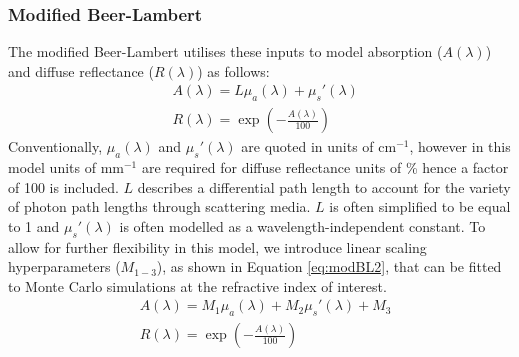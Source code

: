\subsubsection{Modified Beer-Lambert}
The modified Beer-Lambert utilises these inputs to model absorption ($A(\lambda)$) and diffuse reflectance ($R(\lambda)$) as follows: 
\begin{equation}
\begin{aligned}
    & A(\lambda) = L\mu_a(\lambda) + \mu_s'(\lambda) \\
    & R(\lambda) = \exp{\left(-\frac{A(\lambda)}{100}\right)}
\end{aligned}
\label{eq:modBL1}
\end{equation}
Conventionally, $\mu_a(\lambda)$ and $\mu_s'(\lambda)$ are quoted in units of cm\textrm{$^{-1}$}, however in this model units of mm\textrm{$^{-1}$} are required for diffuse reflectance units of \% hence a factor of 100 is included. $L$ describes a differential path length to account for the variety of photon path lengths through scattering media. $L$ is often simplified to be equal to 1 \cite{Clancy2015} and $\mu_s'(\lambda)$ is often modelled as a wavelength-independent constant\cite{Clancy2015, Ma2016}. 
To allow for further flexibility in this model,
we introduce linear scaling hyperparameters ($M_{1-3}$), as shown in Equation \eqref{eq:modBL2}, that can be fitted to Monte Carlo simulations at the refractive index of interest. 
\begin{equation}
\begin{aligned}
    & A(\lambda) = M_1\mu_a(\lambda) + M_2\mu_s'(\lambda) + M_3 \\
    & R(\lambda) = \exp{\left(-\frac{A(\lambda)}{100}\right)}
\end{aligned}
\label{eq:modBL2}
\end{equation}

